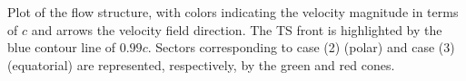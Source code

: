 Plot of the flow structure, with colors indicating the velocity magnitude in terms of $c$ and arrows the velocity field direction. The TS front is highlighted by the blue contour line of $0.99c$. Sectors corresponding to case (2) (polar) and case (3) (equatorial) are represented, respectively, by the green and red cones. \label{fig:ts}